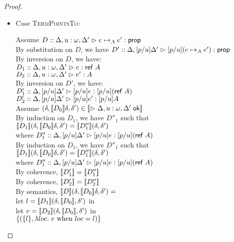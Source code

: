 \begin{proof}
\begin{enumerate}
\begin{itemize}
  \item Case \textsc{TermPointsTo}:
    \begin{tabbedproof}
      \oo Assume $D :: \judgeA[{\Delta, u:\omega, \Delta'}]{e \pointsto_A e'}{\assert}$ \\
      \oo By substitution on $D$, we have $D' :: \judgeA[{\Delta, [p/u]\Delta'}]{[p/u](e \pointsto_A e')}{\assert}$ \\
      \ooo By inversion on $D$, we have: \\
      \oooo $D_1 :: \judgeA[{\Delta, u:\omega, \Delta'}]{e}{\reftype{A}}$ \\
      \oooo $D_2 :: \judgeA[{\Delta, u:\omega, \Delta'}]{e'}{A}$ \\
      \ooo By inversion on $D'$, we have: \\
      \oooo $D'_1 :: \judgeA[{\Delta, [p/u]\Delta'}]{[p/u]e}{[p/u](\reftype{A})}$ \\
      \oooo $D'_2 :: \judgeA[{\Delta, [p/u]\Delta'}]{[p/u]e'}{[p/u]A}$ \\
      \ooo Assume $(\delta, \interp{D_0}\delta, \delta') \in 
                     \interp{\judgeACtx{\Delta, u:\omega, \Delta'}}$ \\
      \oooo By induction on $D_1$, we have $D''_1$ such that \\
      \ooooo $\interp{D_1}(\delta, \interp{D_0}\delta, \delta') = 
              \interp{D''_1}(\delta, \delta')$ \\
      \oooo where $D''_1 :: \judgeA[{\Delta, [p/u]\Delta'}]{[p/u]e}{[p/u](\reftype{A})}$ \\
      \oooo By induction on $D_1$, we have $D''_1$ such that \\
      \ooooo $\interp{D_1}(\delta, \interp{D_0}\delta, \delta') = 
              \interp{D''_1}(\delta, \delta')$ \\
      \oooo where $D''_1 :: \judgeA[{\Delta, [p/u]\Delta'}]{[p/u]e}{[p/u](\reftype{A})}$ \\
      \oooo By coherence, $\interp{D'_1} = \interp{D''_1}$ \\
      \oooo By coherence, $\interp{D'_2} = \interp{D''_2}$ \\
      \oooo By semantics, $\interp{D}(\delta, \interp{D_0}\delta, \delta') = $ \\
      \ooooox let $l = \interp{D_1}(\delta, \interp{D_0}, \delta')$ in \\
      \ooooox let $v = \interp{D_2}(\delta, \interp{D_0}, \delta')$ in \\
      \oooooox $\setof{(\setof{l}, \semfun{loc}{v \mbox{ when }loc = l})}$ \\

\end{tabbedproof}
\end{itemize}
\end{enumerate}
\end{proof}
